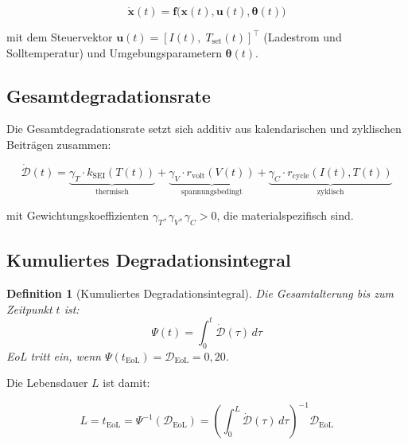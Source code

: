 ﻿\documentclass[12pt,a4paper]{article}
\newtheorem{definition}{Definition}[section]
\begin{document}
	\begin{equation}
		\dot{\mathbf{x}}(t) = \mathbf{f}\bigl(\mathbf{x}(t), \mathbf{u}(t), \boldsymbol{\theta}(t)\bigr)
		\label{eq:state_space}
	\end{equation}
	
	mit dem Steuervektor $\mathbf{u}(t) = [I(t),\; T_\mathrm{set}(t)]^\top$
	(Ladestrom und Solltemperatur) und Umgebungsparametern $\boldsymbol{\theta}(t)$.
	
	\subsection{Gesamtdegradationsrate}
	
	Die Gesamtdegradationsrate setzt sich additiv aus kalendarischen und zyklischen
	Beiträgen zusammen:
	
	\begin{equation}
		\dot{\mathcal{D}}(t) = \underbrace{\gamma_T \cdot k_\mathrm{SEI}(T(t))}_{\text{thermisch}}
		+ \underbrace{\gamma_V \cdot r_\mathrm{volt}(V(t))}_{\text{spannungsbedingt}}
		+ \underbrace{\gamma_C \cdot r_\mathrm{cycle}(I(t), T(t))}_{\text{zyklisch}}
		\label{eq:total_degradation}
	\end{equation}
	
	mit Gewichtungskoeffizienten $\gamma_T, \gamma_V, \gamma_C > 0$, die materialspezifisch
	sind.
	
	\subsection{Kumuliertes Degradationsintegral}
	
	\begin{definition}[Kumuliertes Degradationsintegral]
		Die Gesamtalterung bis zum Zeitpunkt $t$ ist:
		\begin{equation}
			\Psi(t) = \int_0^t \dot{\mathcal{D}}(\tau)\, d\tau
			\label{eq:deg_integral}
		\end{equation}
		EoL tritt ein, wenn $\Psi(t_\mathrm{EoL}) = \mathcal{D}_\mathrm{EoL} = 0{,}20$.
	\end{definition}
	
	Die Lebensdauer $L$ ist damit:
	
	\begin{equation}
		L = t_\mathrm{EoL} = \Psi^{-1}(\mathcal{D}_\mathrm{EoL})
		= \left(\int_0^{L} \dot{\mathcal{D}}(\tau)\, d\tau\right)^{-1} \mathcal{D}_\mathrm{EoL}
		\label{eq:lifetime}
	\end{equation}
	
\end{document}
